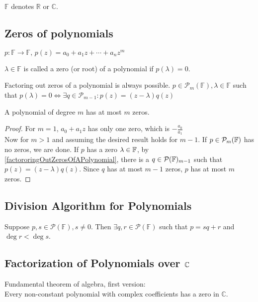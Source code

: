 $\mathbb{F}$ denotes $\mathbb{R}$ or $\mathbb{C}$.

\subsection{Zeros of polynomials}
$p: \mathbb{F} \to \mathbb{F}, \, p(z) = a_0 + a_1z + \cdots + a_n z^m$

\setcounter{thm}{4}
\begin{thm}
  $\lambda \in \mathbb{F}$ is called a zero (or root) of a polynomial if $p(\lambda) = 0$.
\end{thm}

\setcounter{thm}{5}
\begin{thm}
  \label{factororing-out-zeros-of-a-polynomial-always-possible}
  Factoring out zeros of a polynomial is always possible.
  $p \in \mathcal{P}_m(\mathbb{F}), \lambda \in \mathbb{F}$ such that $p(\lambda) = 0 \iff \exists q \in \mathcal{P}_{m-1}: p(z) = (z-\lambda)q(z)$
\end{thm}

\setcounter{thm}{7}
\begin{thm}
  A polynomial of degree $m$ has at most $m$ zeros.
\end{thm}
\begin{proof}
  For $m=1$, $a_0+a_1z$ has only one zero, which is $-\frac{a_0}{a_1}$\\
  Now for $m>1$ and assuming the desired result holds for $m-1$. If $p\in \mathcal{P}_{m}(\mathbb{F})$ has no zeros, we are done. If $p$ has a zero $\lambda \in \mathbb{F}$, by \ref{factororingOutZerosOfAPolynomial}, there is a $q \in \mathcal{P}(\mathbb{F})_{m-1}$ such that $p(z)=(z-\lambda)q(z).$ Since $q$ has at most $m-1$ zeros, $p$ has at most $m$ zeros.
\end{proof}

\subsection{Division Algorithm for Polynomials}

\setcounter{thm}{8}
\begin{thm}
  \label{division-algorithm-for-polynomials}
  Suppose $p,s \in \mathcal{P} (\mathbb{F}), s\neq 0$. Then $\exists q,r \in \mathcal{P} (\mathbb{F})$ such that
  $p=sq+r$ and $\deg r < \deg s$.
\end{thm}

\subsection{Factorization of Polynomials over $\mathbb{C}$}
\setcounter{thm}{11}
\begin{thm}
  \label{fundamental-theorem-of-algebra-first-version}
  Fundamental theorem of algebra, first version: \\
  Every non-constant polynomial with complex coefficients has a zero in $\mathbb{C}$.
\end{thm}

